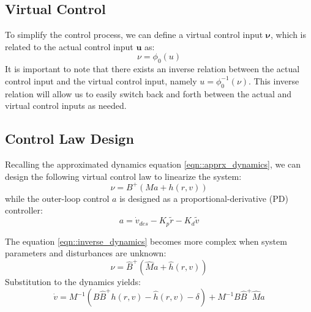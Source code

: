     \subsection{Virtual Control}
    To simplify the control process, we can define a virtual control
    input $\boldsymbol{\nu}$, which is related to the actual control input $\mathbf{u}$ 
    as:
    \begin{equation}
        \nu = \phi_0(u)
    \end{equation} 
    It is important to note that there exists an inverse relation between 
    the actual control input and the virtual control input, namely 
    $u = \phi_0^{-1}(\nu)$. 
    This inverse relation will allow us to easily switch back and forth 
    between the actual and virtual control inputs as needed.

    \subsection{Control Law Design}
      Recalling the approximated dynamics equation \ref{eqn::apprx_dynamics}, we can design the following virtual control law to 
    linearize the system:
    \begin{equation}
        \label{eqn::inverse_dynamics}
        \nu = B^{+} (Ma + h(r, v))
    \end{equation}
    while the outer-loop control $a$ is designed as a proportional-derivative (PD) controller:
    \begin{equation}
        a = \dot{v}_{des} - K_p \tilde{r} - K_d \tilde{v}
    \end{equation}

    The equation \ref{eqn::inverse_dynamics} becomes more complex when system parameters and disturbances are 
    unknown:
    \begin{equation}
    \nu = \hat{B}^{+}(\hat{M}a + \hat h(r, v))
    \end{equation}
    Substitution to the dynamics yields:
    \begin{equation}
    \dot{v} = M^{-1}(B\hat{B}^{+}h(r, v) - \hat h(r, v) - \delta) + 
    M^{-1}B\hat{B}^{+}\hat{M}a
    \end{equation}

